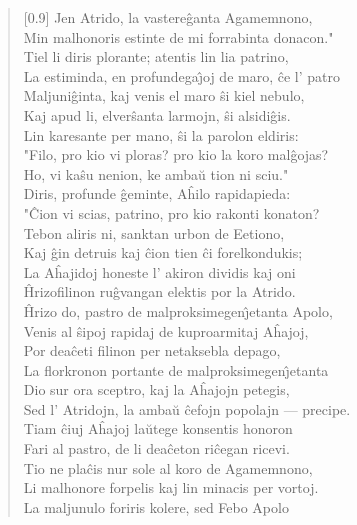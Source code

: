 \begin{verse}[0.9\textwidth]
          Jen Atrido, la vastere\^ganta Agamemnono,\\
          Min malhonoris estinte de mi forrabinta donacon."\\
          \vin   Tiel li diris plorante; atentis lin lia patrino,\\
          La estiminda, en profundega\^{\j}oj de maro, \^ce l' patro\\
          Maljuni\^ginta, kaj venis el maro \^si kiel nebulo,\\
          Kaj apud li, elver\^santa larmojn, \^si alsidi\^gis.\\
          Lin karesante per mano, \^si la parolon eldiris:\\
          \vin   "Filo, pro kio vi ploras? pro kio la koro mal\^gojas?\\
          Ho, vi ka\^su nenion, ke amba\u u tion ni sciu."\\
          \vin   Diris, profunde \^geminte, A\^hilo rapidapieda:\\
          "\^Cion vi scias, patrino, pro kio rakonti konaton?\\
          Tebon aliris ni, sanktan urbon de Eetiono,\\
          Kaj \^gin detruis kaj \^cion tien \^ci forelkondukis;\\
          La A\^hajidoj honeste l' akiron dividis kaj oni\\
          \^Hrizofilinon ru\^gvangan elektis por la Atrido.\\
          \^Hrizo do, pastro de malproksimegen\^{\j}etanta Apolo,\\
          Venis al \^sipoj rapidaj de kuproarmitaj A\^hajoj,\\
          Por dea\^ceti filinon per netaksebla depago,\\
          La florkronon portante de malproksimegen\^{\j}etanta\\
          Dio sur ora sceptro, kaj la A\^hajojn petegis,\\
          Sed l' Atridojn, la amba\u u \^cefojn popolajn --- precipe.\\
          Tiam \^ciuj A\^hajoj la\u utege konsentis honoron\\
          Fari al pastro, de li dea\^ceton ri\^cegan ricevi.\\
          Tio ne pla\^cis nur sole al koro de Agamemnono,\\
          Li malhonore forpelis kaj lin minacis per vortoj.\\
          La maljunulo foriris kolere, sed Febo Apolo\\

\end{verse}
